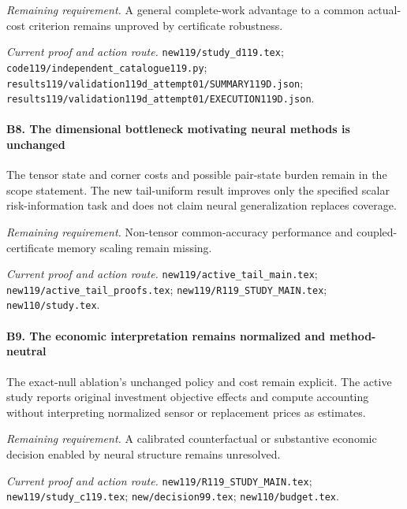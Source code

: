\par\emph{Remaining requirement.} A general complete-work advantage to a common actual-cost criterion remains unproved by certificate robustness.

\par\emph{Current proof and action route.} \nolinkurl{new119/study_d119.tex}; \nolinkurl{code119/independent_catalogue119.py}; \nolinkurl{results119/validation119d_attempt01/SUMMARY119D.json}; \nolinkurl{results119/validation119d_attempt01/EXECUTION119D.json}.

\paragraph{B8. The dimensional bottleneck motivating neural methods is unchanged}

The tensor state and corner costs and possible pair-state burden remain in the scope statement. The new tail-uniform result improves only the specified scalar risk-information task and does not claim neural generalization replaces coverage.

\par\emph{Remaining requirement.} Non-tensor common-accuracy performance and coupled-certificate memory scaling remain missing.

\par\emph{Current proof and action route.} \nolinkurl{new119/active_tail_main.tex}; \nolinkurl{new119/active_tail_proofs.tex}; \nolinkurl{new119/R119_STUDY_MAIN.tex}; \nolinkurl{new110/study.tex}.

\paragraph{B9. The economic interpretation remains normalized and method-neutral}

The exact-null ablation's unchanged policy and cost remain explicit. The active study reports original investment objective effects and compute accounting without interpreting normalized sensor or replacement prices as estimates.

\par\emph{Remaining requirement.} A calibrated counterfactual or substantive economic decision enabled by neural structure remains unresolved.

\par\emph{Current proof and action route.} \nolinkurl{new119/R119_STUDY_MAIN.tex}; \nolinkurl{new119/study_c119.tex}; \nolinkurl{new/decision99.tex}; \nolinkurl{new110/budget.tex}.

